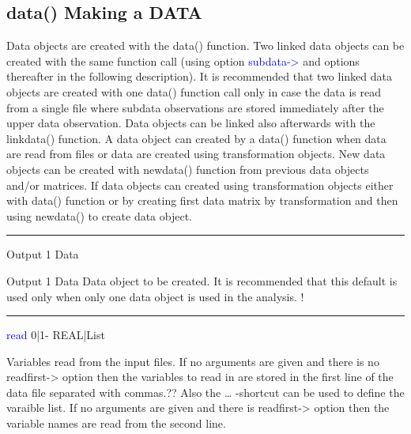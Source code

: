 \subsection{\textcolor{VioletRed}{data}() Making a DATA}
\label{data}
Data objects are created with the \textcolor{VioletRed}{data}() function. Two linked data objects can be created with the
same function call (using option \textcolor{blue}{subdata->} and options thereafter in the following
description). It is recommended that two linked data objects are created with one \textcolor{VioletRed}{data}()
function call only in case the data is read from a single file where subdata observations are
stored immediately after the upper data observation.  Data objects can be linked also afterwards with the \textcolor{VioletRed}{linkdata}() function.
A data object can created by a \textcolor{VioletRed}{data}() function when data are read from files
or data are created using transformation objects. New data objects can
be created with \textcolor{VioletRed}{newdata}() function from previous data objects and/or matrices.
If data objects can created using transformation objects either with \textcolor{VioletRed}{data}() function
or by creating first data matrix by transformation and then using \textcolor{VioletRed}{newdata}() to
create data object.
\vspace{0.3cm}
\hrule
\vspace{0.3cm}
\noindent Output  \tabto{3cm} 1 \tabto{5cm}  Data \tabto{7cm}
\begin{changemargin}{3cm}{0cm}
\noindent \noindent Output  \tabto{3cm} 1 \tabto{5cm}  Data \tabto{7cm}
Data object to be created.
It is recommended that this default is used only when only one data object
is used in the analysis.
	!
\end{changemargin}
\vspace{0.3cm}
\hrule
\vspace{0.3cm}
\noindent \textcolor{blue}{read}  \tabto{3cm} 0|1- \tabto{5cm}  REAL|List \tabto{7cm}
\begin{changemargin}{3cm}{0cm}
\noindent  Variables read from the input files. If no arguments are given and there is no readfirst-> option
then the variables to read in are stored in the first line of the data file separated
with commas.?? Also the … -shortcut can be used to define the varaible list. If no arguments are given and
there is readfirst-> option then the variable names are read from the second
line.
\end{changemargin}
\vspace{0.3cm}
